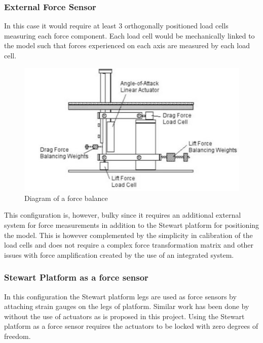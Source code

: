 \subsubsection*{External Force Sensor}
In this case it would require at least 3 orthogonally positioned load cells measuring each force component. Each load cell would be mechanically linked to the model such that forces experienced on each axis are measured by each load cell. 
\begin{center}
	\begin{figure}[H]
		\centering
		\includegraphics{Figures/modBal}
		\caption[Diagram of a force balance]{Diagram of a force balance \cite{post_force_2010}}
	\end{figure}
\end{center}
This configuration is, however, bulky since it requires an additional external system for force measurements in addition to the Stewart platform for positioning the model. This is however complemented by the simplicity in calibration of the load cells and does not require a complex force transformation matrix and other issues with force amplification created by the use of an integrated system.
\subsubsection*{Stewart Platform as a force sensor}
In this configuration the Stewart platform legs are used as force sensors by attaching strain gauges on the legs of platform. Similar work has been done by \cite{ferreira2015design} without the use of actuators as is proposed in this project. Using the Stewart platform as a force sensor requires the actuators to be locked with zero degrees of freedom.

